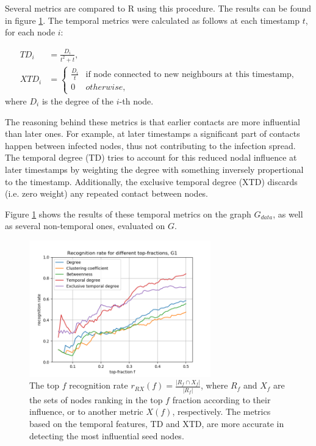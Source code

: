 \documentclass[letterpaper]{article}
\begin{document}
\noindent Several metrics are compared to R using this procedure. The results can be found in figure \ref{fig:rankG}. The temporal metrics were calculated as follows at each timestamp \(t\), for each node \(i\):

\begin{align*}
	TD_i &= \frac{D_i}{t^2+t},\\
	XTD_i &= 
		\begin{cases}
		\frac{D_i}{t}& \text{if node connected to new neighbours at this timestamp,}\\
		0& otherwise,
		\end{cases}
\end{align*}
\noindent where \(D_i\) is the degree of the \(i\)-th node.

The reasoning behind these metrics is that earlier contacts are more influential than later ones. For example, at later timestamps a significant part of contacts happen between infected nodes, thus not contributing to the infection spread. The temporal degree (TD) tries to account for this reduced nodal influence at later timestamps by weighting the degree with something inversely propertional to the timestamp. 
Additionally, the exclusive temporal degree (XTD) discards (i.e. zero weight) any repeated contact between nodes.

Figure \ref{fig:rankG} shows the results of these temporal metrics on the graph \(G_{data}\), as well as several non-temporal ones, evaluated on \(G\). 

\begin{figure}[ht]
  \centering
   \includegraphics[width=0.7\textwidth]{img/rankG.png}
   \caption{\small{The top $f$ recognition rate $r_{RX}(f) = \frac{ |R_f \cap X_f| }{ |R_f| }$, where $R_f$ and $X_f$ are the sets of nodes ranking in the top $f$ fraction according to their influence,  or to another metric $X(f)$, respectively. The metrics based on the temporal features, TD and XTD, are more accurate in detecting the most influential seed nodes.}}
   \label{fig:rankG}
\end{figure}
\end{document}

